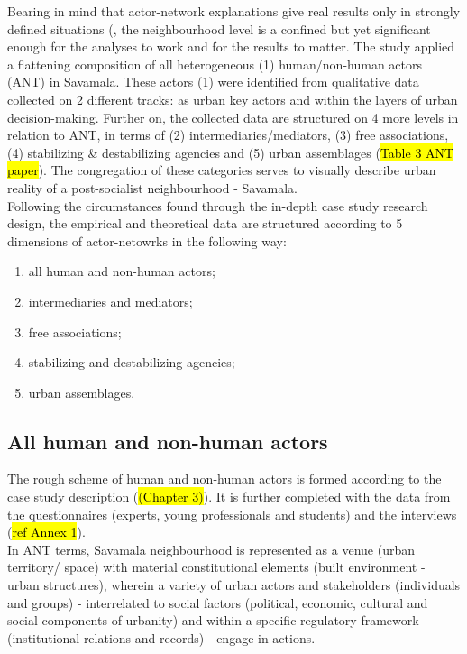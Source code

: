 \documentclass[11pt]{report}
\begin{document}
Bearing in mind that actor-network explanations give real results only in strongly defined situations (\cite{Farías and Bender, 2011)}, the neighbourhood level is a confined but yet significant enough for the analyses to work and for the results to matter.
The study applied a flattening composition of all heterogeneous (1) human/non-human actors (ANT) in Savamala.
These actors (1) were identified from qualitative data collected on 2 different tracks: as urban key actors and within the layers of urban decision-making.
Further on, the collected data are structured on 4 more levels in relation to ANT, in terms of (2) intermediaries/mediators, (3) free associations, (4) stabilizing \& destabilizing agencies and (5) urban assemblages (\hl{Table 3 ANT paper}).
The congregation of these categories serves to visually describe urban reality of a post-socialist neighbourhood - Savamala.
\\

Following the circumstances found through the in-depth case study research design, the empirical and theoretical data are structured according to 5 dimensions of actor-netowrks in the following way:

\begin{enumerate}
\item all human and non-human actors;
\item intermediaries and mediators;
\item free associations;
\item stabilizing and destabilizing agencies;
\item urban assemblages.
\end{enumerate}

\subsection{All human and non-human actors}

The rough scheme of human and non-human actors is formed according to the case study description
(\hl{(Chapter 3)}). It is further completed with the data from the questionnaires (experts, young professionals and students) and the interviews
(\hl{ref Annex 1}).
\\

In ANT terms, Savamala neighbourhood is represented as a venue (urban territory/ space) with material constitutional elements (built environment - urban structures), wherein a variety of urban actors and stakeholders (individuals and groups) - interrelated to social factors (political, economic, cultural and social components of urbanity) and within a specific regulatory framework (institutional relations and records) - engage in actions.
\\
\end{document}
